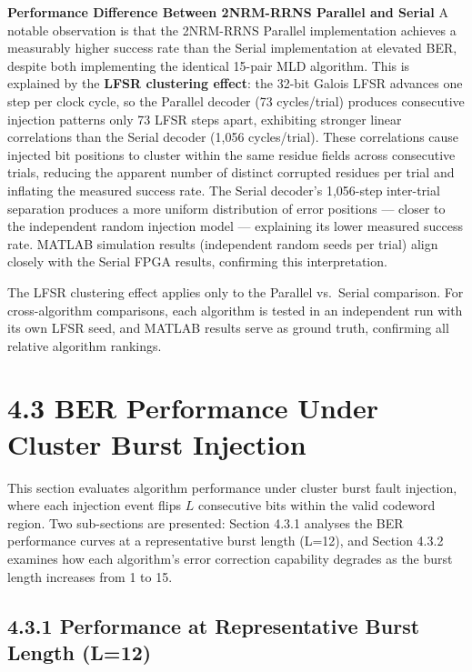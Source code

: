 \documentclass[
  english,
  12pt,
]{report}
\begin{document}
\textbf{Performance Difference Between 2NRM-RRNS Parallel and Serial} A
notable observation is that the 2NRM-RRNS Parallel implementation
achieves a measurably higher success rate than the Serial implementation
at elevated BER, despite both implementing the identical 15-pair MLD
algorithm. This is explained by the \textbf{LFSR clustering effect}: the
32-bit Galois LFSR advances one step per clock cycle, so the Parallel
decoder (73 cycles/trial) produces consecutive injection patterns only
73 LFSR steps apart, exhibiting stronger linear correlations than the
Serial decoder (1,056 cycles/trial). These correlations cause injected
bit positions to cluster within the same residue fields across
consecutive trials, reducing the apparent number of distinct corrupted
residues per trial and inflating the measured success rate. The Serial
decoder's 1,056-step inter-trial separation produces a more uniform
distribution of error positions --- closer to the independent random
injection model --- explaining its lower measured success rate. MATLAB
simulation results (independent random seeds per trial) align closely
with the Serial FPGA results, confirming this interpretation.

The LFSR clustering effect applies only to the Parallel vs.~Serial
comparison. For cross-algorithm comparisons, each algorithm is tested in
an independent run with its own LFSR seed, and MATLAB results serve as
ground truth, confirming all relative algorithm rankings.

\section{4.3 BER Performance Under Cluster Burst
Injection}\label{ber-performance-under-cluster-burst-injection}

This section evaluates algorithm performance under cluster burst fault
injection, where each injection event flips \(L\) consecutive bits
within the valid codeword region. Two sub-sections are presented:
Section 4.3.1 analyses the BER performance curves at a representative
burst length (L=12), and Section 4.3.2 examines how each algorithm's
error correction capability degrades as the burst length increases from
1 to 15.

\subsection{4.3.1 Performance at Representative Burst Length
(L=12)}\label{performance-at-representative-burst-length-l12}
\end{document}

